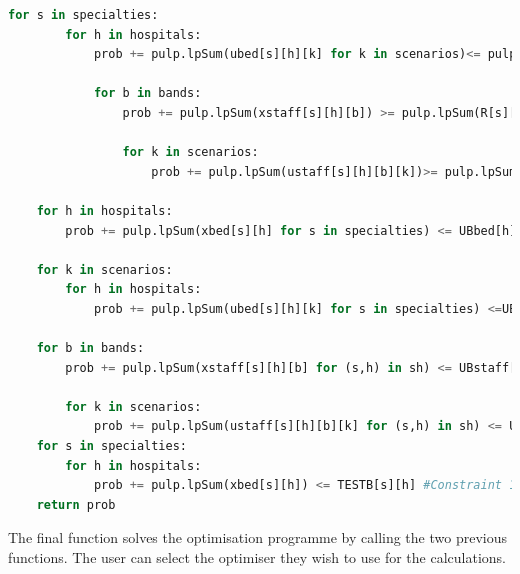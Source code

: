 \documentclass[../thesis.tex]{subfiles}
\begin{document}
\begin{lstlisting}[language=python]
    for s in specialties: 
        for h in hospitals:
            prob += pulp.lpSum(ubed[s][h][k] for k in scenarios)<= pulp.lpSum(K[s][h]) #Constraint 8
            
            for b in bands:
                prob += pulp.lpSum(xstaff[s][h][b]) >= pulp.lpSum(R[s][b]*(xbed[s][h])) #Constraint 9
                
                for k in scenarios:
                    prob += pulp.lpSum(ustaff[s][h][b][k])>= pulp.lpSum(R[s][b]*(ubed[s][h][k])) #Constraint 10
                    
    for h in hospitals:
        prob += pulp.lpSum(xbed[s][h] for s in specialties) <= UBbed[h] #Constraint 11
        
    for k in scenarios: 
        for h in hospitals:
            prob += pulp.lpSum(ubed[s][h][k] for s in specialties) <=UBubed[h][k] #Constraint 12
        
    for b in bands:
        prob += pulp.lpSum(xstaff[s][h][b] for (s,h) in sh) <= UBstaff[b] #Constraint 13
        
        for k in scenarios:
            prob += pulp.lpSum(ustaff[s][h][b][k] for (s,h) in sh) <= UBustaff[b][k] #Constraint 14
    for s in specialties:
        for h in hospitals:
            prob += pulp.lpSum(xbed[s][h]) <= TESTB[s][h] #Constraint 15                  
    return prob
\end{lstlisting}

The final function solves the optimisation programme by calling the two previous functions. The user can select the optimiser they wish to use for the calculations.
\end{document}
